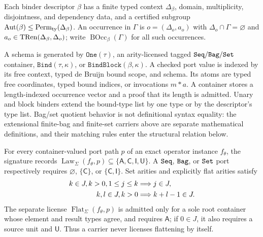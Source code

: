 Each binder descriptor $\beta$ has a finite typed context $\Delta_\beta$,
domain, multiplicity, disjointness, and dependency data, and a certified subgroup
$\operatorname{Aut}(\beta)\leq\operatorname{Perm}_{\rm ty}(\Delta_\beta)$.
An occurrence in $\Gamma$ is $o=(\Delta_o,a_o)$ with
$\Delta_o\cap\Gamma=\varnothing$ and
$a_o\in\operatorname{TRen}(\Delta_\beta,\Delta_o)$; write
$\operatorname{BOcc}_\beta(\Gamma)$ for all such occurrences.

\begin{definition}
\label{res:F05}
A schema is generated by $\texttt{One}(\tau)$, an arity-licensed tagged
$\texttt{Seq}/\texttt{Bag}/\texttt{Set}$ container, $\texttt{Bind}(\tau,\kappa)$, or
$\texttt{BindBlock}(\beta,\kappa)$.  A checked port value is indexed by its
free context, typed de Bruijn bound scope, and schema.  Its atoms are typed
free coordinates, typed bound indices, or invocations $m*a$.  A container
stores a length-indexed occurrence vector and a proof that its length is
admitted.  Unary and block binders extend the bound-type list by one type or
by the descriptor's type list.  Bag/set quotient behavior is not definitional
syntax equality: the extensional finite-bag and finite-set carriers above are
separate mathematical definitions, and their matching rules enter the
structural relation below.
\end{definition}

For every container-valued port path $p$ of an exact operator instance
$f_\theta$, the signature records
$\operatorname{Law}_\Sigma(f_\theta,p)\subseteq
\{\mathsf A,\mathsf C,\mathsf I,\mathsf U\}$.  A $\texttt{Seq}$, $\texttt{Bag}$, or $\texttt{Set}$
port respectively requires $\varnothing$, $\{\mathsf C\}$, or
$\{\mathsf C,\mathsf I\}$.  Set arities and explicitly flat arities satisfy
\begin{align}
k\in J, k>0, 1\le j\le k&\Longrightarrow j\in J,
\label{eq:set-arity-closure}\\
\leanref{TSG-INV-002}{TypedSlottedEGraphsPaper.AtomicLedger.FlatAritySpliceClosed}
k,l\in J, k>0&\Longrightarrow k+l-1\in J.
\label{eq:flat-arity-closure}
\end{align}
The separate license $\operatorname{Flat}_\Sigma(f_\theta,p)$ is admitted
only for a sole root container whose element and result types agree, and
requires $\mathsf A$; if $0\in J$, it also requires a source unit and
$\mathsf U$.  Thus a carrier never licenses flattening by itself.

